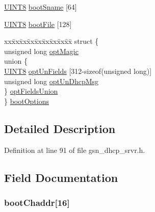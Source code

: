 \begin{DoxyCompactItemize}
\hyperlink{a00660_gab27e9918b538ce9d8ca692479b375b6a}{UINT8} \hyperlink{a00046_a2c25a626f887cce100878940ec833b9b}{bootSname} \mbox{[}64\mbox{]}
\item 
\hyperlink{a00660_gab27e9918b538ce9d8ca692479b375b6a}{UINT8} \hyperlink{a00046_ab799fcd688f0b9f083d02928b070469c}{bootFile} \mbox{[}128\mbox{]}
\item 
\begin{tabbing}
xx\=xx\=xx\=xx\=xx\=xx\=xx\=xx\=xx\=\kill
struct \{\\
\>unsigned long \hyperlink{a00046_abae004f76576c98d26dc7265cb169cb7}{optMagic}\\
\>union \{\\
\>\>\hyperlink{a00660_gab27e9918b538ce9d8ca692479b375b6a}{UINT8} \hyperlink{a00046_a84256f38f4097ee6713ebf0937ebee9e}{optUnFields} \mbox{[}312-\/sizeof(unsigned long)\mbox{]}\\
\>\>unsigned long \hyperlink{a00046_a05cd9a158761d6a0f39b0368c71123da}{optUnDhcpMsg}\\
\>\} \hyperlink{a00046_ade6ea719c201c8a3928fffa4f47f52c4}{optFieldsUnion}\\
\} \hyperlink{a00046_ad645ac868c4d8259e1ee85cd240c8654}{bootOptions}\\

\end{tabbing}\end{DoxyCompactItemize}


\subsection{Detailed Description}


Definition at line 91 of file gsn\_\-dhcp\_\-srvr.h.



\subsection{Field Documentation}
\hypertarget{a00046_a087f494fda2caad84904be6ab979c237}{
\subsubsection[{bootChaddr}]{ {\bf bootChaddr}\mbox{[}16\mbox{]}}}
\label{a00046_a087f494fda2caad84904be6ab979c237}



